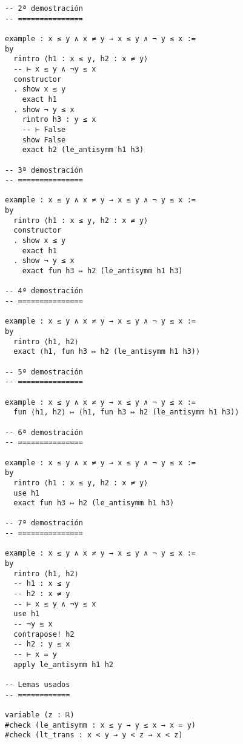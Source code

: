 \begin{verbatim}
-- 2ª demostración
-- ===============

example : x ≤ y ∧ x ≠ y → x ≤ y ∧ ¬ y ≤ x :=
by
  rintro ⟨h1 : x ≤ y, h2 : x ≠ y⟩
  -- ⊢ x ≤ y ∧ ¬y ≤ x
  constructor
  . show x ≤ y
    exact h1
  . show ¬ y ≤ x
    rintro h3 : y ≤ x
    -- ⊢ False
    show False
    exact h2 (le_antisymm h1 h3)

-- 3ª demostración
-- ===============

example : x ≤ y ∧ x ≠ y → x ≤ y ∧ ¬ y ≤ x :=
by
  rintro ⟨h1 : x ≤ y, h2 : x ≠ y⟩
  constructor
  . show x ≤ y
    exact h1
  . show ¬ y ≤ x
    exact fun h3 ↦ h2 (le_antisymm h1 h3)

-- 4ª demostración
-- ===============

example : x ≤ y ∧ x ≠ y → x ≤ y ∧ ¬ y ≤ x :=
by
  rintro ⟨h1, h2⟩
  exact ⟨h1, fun h3 ↦ h2 (le_antisymm h1 h3)⟩

-- 5ª demostración
-- ===============

example : x ≤ y ∧ x ≠ y → x ≤ y ∧ ¬ y ≤ x :=
  fun ⟨h1, h2⟩ ↦ ⟨h1, fun h3 ↦ h2 (le_antisymm h1 h3)⟩

-- 6ª demostración
-- ===============

example : x ≤ y ∧ x ≠ y → x ≤ y ∧ ¬ y ≤ x :=
by
  rintro ⟨h1 : x ≤ y, h2 : x ≠ y⟩
  use h1
  exact fun h3 ↦ h2 (le_antisymm h1 h3)

-- 7ª demostración
-- ===============

example : x ≤ y ∧ x ≠ y → x ≤ y ∧ ¬ y ≤ x :=
by
  rintro ⟨h1, h2⟩
  -- h1 : x ≤ y
  -- h2 : x ≠ y
  -- ⊢ x ≤ y ∧ ¬y ≤ x
  use h1
  -- ¬y ≤ x
  contrapose! h2
  -- h2 : y ≤ x
  -- ⊢ x = y
  apply le_antisymm h1 h2

-- Lemas usados
-- ============

variable (z : ℝ)
#check (le_antisymm : x ≤ y → y ≤ x → x = y)
#check (lt_trans : x < y → y < z → x < z)
\end{verbatim}

